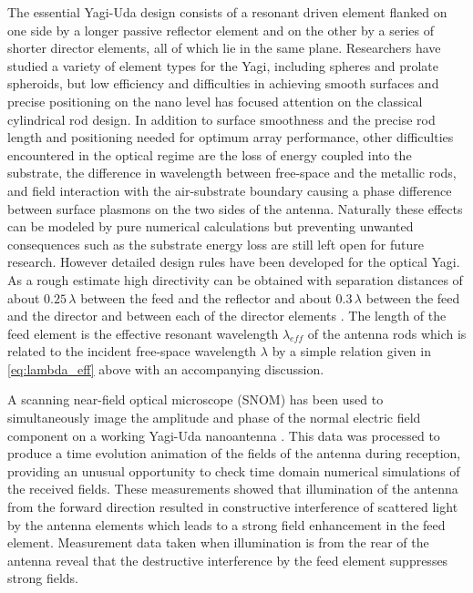 \documentclass[11pt]{article}
\begin{document}
The essential Yagi-Uda design consists of a resonant driven element flanked on one side by a longer passive reflector element and on the other by a series of shorter director elements, all of which lie in the same plane. Researchers have studied a variety of element types for the Yagi, including spheres and prolate spheroids, but low efficiency and difficulties in achieving smooth surfaces and precise positioning on the nano level has focused attention on the classical cylindrical rod design. In addition to surface smoothness and the precise rod length and positioning needed for optimum array performance, other difficulties encountered in the optical regime are the loss of energy coupled into the substrate, the difference in wavelength between free-space and the metallic rods, and field interaction with the air-substrate boundary causing a phase difference between surface plasmons on the two sides of the antenna. Naturally these effects can be modeled by pure numerical calculations but preventing unwanted consequences such as the substrate energy loss are still left open for future research. However detailed design rules have been developed
\cite{Hofmann2007} for the optical Yagi. As a rough estimate high directivity can be obtained with separation distances of about $0.25\, \lambda$ between the feed and the reflector and about $0.3\, \lambda$ between the feed and the director and between each of the director elements \cite{Kosako2010}. The length of the feed element is the effective resonant wavelength $\lambda_{eff}$ of the antenna rods which is related to the incident free-space wavelength $\lambda$ by a simple relation given in \eqref{eq:lambda_eff} above with an accompanying discussion.

A scanning near-field optical microscope (SNOM) has been used to simultaneously image the amplitude and phase of the normal electric field component on a working Yagi-Uda nanoantenna \cite{Dorfmuller2011}. This data was processed to produce a time evolution animation of the fields of the antenna during reception, providing an unusual opportunity to check time domain numerical simulations of the received fields. These measurements showed that illumination of the antenna from the forward direction resulted in constructive interference of scattered light by the antenna elements which leads to a strong field enhancement in the feed element. Measurement data taken when illumination is from the rear of the antenna reveal that the destructive interference by the feed element suppresses strong fields.
\end{document}
